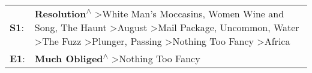 \begin{supertabular}{p{0.03\textwidth}p{0.92\textwidth}}
 \textbf{S1}:  &  \textbf{Resolution\textsuperscript{$\wedge$}} \textgreater \enspace White Man's Moccasins\textsuperscript{}, \enspace Women Wine and Song\textsuperscript{}, \enspace The Haunt\textsuperscript{} \textgreater \enspace August\textsuperscript{} \textgreater \enspace Mail Package\textsuperscript{}, \enspace Uncommon\textsuperscript{}, \enspace Water\textsuperscript{} \textgreater \enspace The Fuzz\textsuperscript{} \textgreater \enspace Plunger\textsuperscript{}, \enspace Passing\textsuperscript{} \textgreater \enspace Nothing Too Fancy\textsuperscript{} \textgreater \enspace Africa\textsuperscript{}  \enspace  \\
 \textbf{E1}:  &                                                                                                                                                                                                                                                                                                                                                                                                                                                                                                                   \textbf{Much Obliged\textsuperscript{$\wedge$}} \textgreater \enspace Nothing Too Fancy\textsuperscript{}  \enspace  \\
\end{supertabular}
